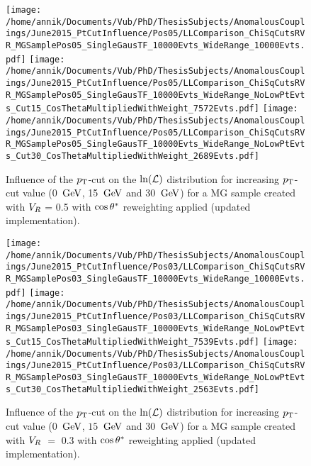 \begin{figure}[h!t]
 \centering
 \texttt{[image: /home/annik/Documents/Vub/PhD/ThesisSubjects/AnomalousCouplings/June2015\_PtCutInfluence/Pos05/LLComparison\_ChiSqCutsRVR\_MGSamplePos05\_SingleGausTF\_10000Evts\_WideRange\_10000Evts.pdf]}
 \texttt{[image: /home/annik/Documents/Vub/PhD/ThesisSubjects/AnomalousCouplings/June2015\_PtCutInfluence/Pos05/LLComparison\_ChiSqCutsRVR\_MGSamplePos05\_SingleGausTF\_10000Evts\_WideRange\_NoLowPtEvts\_Cut15\_CosThetaMultipliedWithWeight\_7572Evts.pdf]}
 \texttt{[image: /home/annik/Documents/Vub/PhD/ThesisSubjects/AnomalousCouplings/June2015\_PtCutInfluence/Pos05/LLComparison\_ChiSqCutsRVR\_MGSamplePos05\_SingleGausTF\_10000Evts\_WideRange\_NoLowPtEvts\_Cut30\_CosThetaMultipliedWithWeight\_2689Evts.pdf]}
 \caption{Influence of the $p_{\textrm T}$-cut on the $\ln(\mathcal{L})$ distribution for increasing $p_{\textrm T}$-cut value (0 $\, \mathrm{GeV}$, 15 $\, \mathrm{GeV}$ and 30 $\, \mathrm{GeV}$) for a MG sample created with $V_{R}$ = 0.5 with $\cos \theta^{*}$ reweighting applied (updated implementation).}
 \label{fig::CosThetaPos05Update}
\end{figure}

\begin{figure}[h!t]
 \centering
 \texttt{[image: /home/annik/Documents/Vub/PhD/ThesisSubjects/AnomalousCouplings/June2015\_PtCutInfluence/Pos03/LLComparison\_ChiSqCutsRVR\_MGSamplePos03\_SingleGausTF\_10000Evts\_WideRange\_10000Evts.pdf]}
 \texttt{[image: /home/annik/Documents/Vub/PhD/ThesisSubjects/AnomalousCouplings/June2015\_PtCutInfluence/Pos03/LLComparison\_ChiSqCutsRVR\_MGSamplePos03\_SingleGausTF\_10000Evts\_WideRange\_NoLowPtEvts\_Cut15\_CosThetaMultipliedWithWeight\_7539Evts.pdf]}
 \texttt{[image: /home/annik/Documents/Vub/PhD/ThesisSubjects/AnomalousCouplings/June2015\_PtCutInfluence/Pos03/LLComparison\_ChiSqCutsRVR\_MGSamplePos03\_SingleGausTF\_10000Evts\_WideRange\_NoLowPtEvts\_Cut30\_CosThetaMultipliedWithWeight\_2563Evts.pdf]}
 \caption{Influence of the $p_{\textrm T}$-cut on the $\ln(\mathcal{L})$ distribution for increasing $p_{\textrm T}$-cut value ($0$ $\, \mathrm{GeV}$, $15$ $\, \mathrm{GeV}$ and $30$ $\, \mathrm{GeV}$) for a MG sample created with $V_{R}$ $=$ $0.3$ with $\cos \theta^{*}$ reweighting applied (updated implementation).}
 \label{fig::CosThetaPos03Update}
\end{figure}

